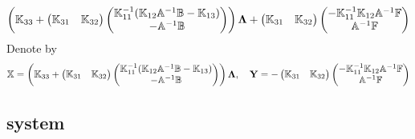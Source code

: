 \documentclass[10pt,reqno, final]{amsart}
\begin{document}
\begin{equation}\label{1last}
\left(\mathbb{K}_{33}+
\begin{pmatrix}
\mathbb{K}_{31} & \mathbb{K}_{32}
\end{pmatrix}\begin{pmatrix}
\mathbb{K}_{11}^{-1}(\mathbb{K}_{12}\mathbb{A}^{-1}\mathbb{B}-\mathbb{K}_{13})\\
-\mathbb{A}^{-1}\mathbb{B}
\end{pmatrix}\right){\bf\Lambda}+
\begin{pmatrix}
\mathbb{K}_{31} & \mathbb{K}_{32}
\end{pmatrix}\begin{pmatrix}
-\mathbb{K}_{11}^{-1}\mathbb{K}_{12}\mathbb{A}^{-1}\mathbb{F}\\
\mathbb{A}^{-1}\mathbb{F}
\end{pmatrix}
\end{equation}
Denote by
\begin{equation*}
  \mathbb{X} =
  \left(\mathbb{K}_{33}+
\begin{pmatrix}
\mathbb{K}_{31} & \mathbb{K}_{32}
\end{pmatrix}\begin{pmatrix}
\mathbb{K}_{11}^{-1}(\mathbb{K}_{12}\mathbb{A}^{-1}\mathbb{B}-\mathbb{K}_{13})\\
-\mathbb{A}^{-1}\mathbb{B}
\end{pmatrix}\right){\bf\Lambda}
,\quad
  {\bf Y} = -
\begin{pmatrix}
\mathbb{K}_{31} & \mathbb{K}_{32}
\end{pmatrix}\begin{pmatrix}
-\mathbb{K}_{11}^{-1}\mathbb{K}_{12}\mathbb{A}^{-1}\mathbb{F}\\
\mathbb{A}^{-1}\mathbb{F}
\end{pmatrix}
\end{equation*}
\subsection{system}
\end{document}
